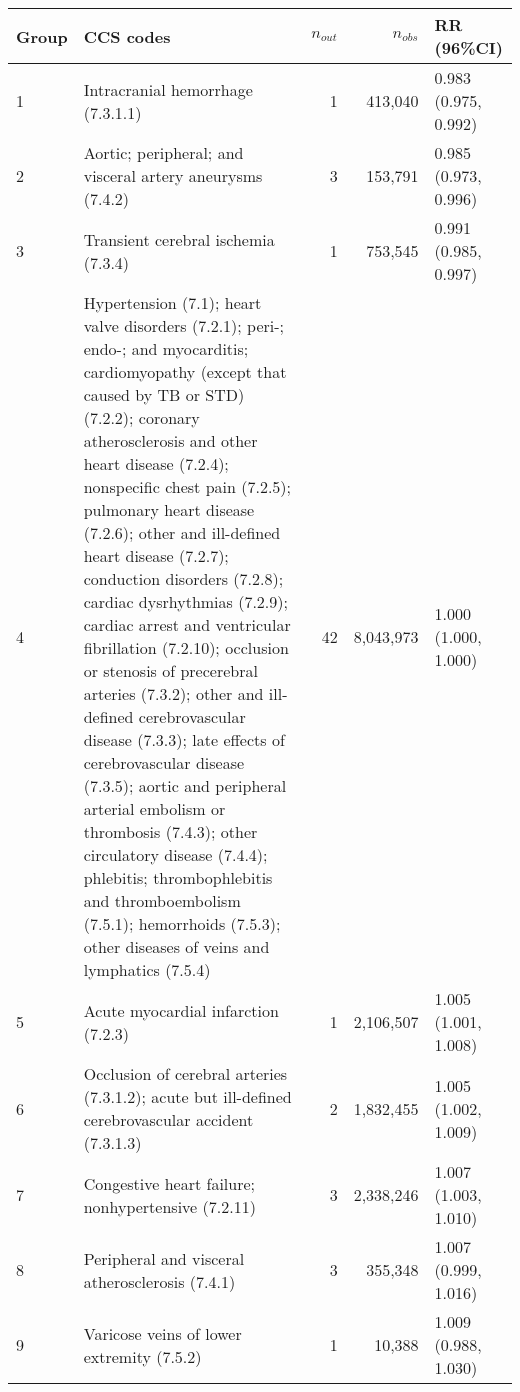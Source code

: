 \begin{tabular}{lp{6.5cm}rrp{2.2cm}}
  \hline
Group & CCS codes & $n_{out}$ & $n_{obs}$ & RR (96\%CI) \\ 
  \hline
   1 & Intracranial hemorrhage (7.3.1.1) &    1 & 413,040 & 0.983 (0.975, 0.992) \\ 
     2 & Aortic; peripheral; and visceral artery aneurysms (7.4.2) &    3 & 153,791 & 0.985 (0.973, 0.996) \\ 
     3 & Transient cerebral ischemia (7.3.4) &    1 & 753,545 & 0.991 (0.985, 0.997) \\ 
     4 & Hypertension (7.1); heart valve disorders (7.2.1); peri-; endo-; and myocarditis; cardiomyopathy (except that caused by TB or STD) (7.2.2); coronary atherosclerosis and other heart disease (7.2.4); nonspecific chest pain (7.2.5); pulmonary heart disease (7.2.6); other and ill-defined heart disease (7.2.7); conduction disorders (7.2.8); cardiac dysrhythmias (7.2.9); cardiac arrest and ventricular fibrillation (7.2.10); occlusion or stenosis of precerebral arteries (7.3.2); other and ill-defined cerebrovascular disease (7.3.3); late effects of cerebrovascular disease (7.3.5); aortic and peripheral arterial embolism or thrombosis (7.4.3); other circulatory disease (7.4.4); phlebitis; thrombophlebitis and thromboembolism (7.5.1); hemorrhoids (7.5.3); other diseases of veins and lymphatics (7.5.4) &   42 & 8,043,973 & 1.000 (1.000, 1.000) \\ 
     5 & Acute myocardial infarction (7.2.3) &    1 & 2,106,507 & 1.005 (1.001, 1.008) \\ 
     6 & Occlusion of cerebral arteries (7.3.1.2); acute but ill-defined cerebrovascular accident (7.3.1.3) &    2 & 1,832,455 & 1.005 (1.002, 1.009) \\ 
     7 & Congestive heart failure; nonhypertensive (7.2.11) &    3 & 2,338,246 & 1.007 (1.003, 1.010) \\ 
     8 & Peripheral and visceral atherosclerosis (7.4.1) &    3 & 355,348 & 1.007 (0.999, 1.016) \\ 
     9 & Varicose veins of lower extremity (7.5.2) &    1 & 10,388 & 1.009 (0.988, 1.030) \\ 
   \hline
\end{tabular}

